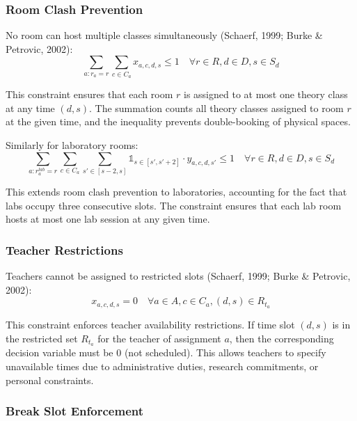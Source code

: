 \documentclass[12pt,a4paper]{article}
\begin{document}
\subsubsection{Room Clash Prevention}

No room can host multiple classes simultaneously (Schaerf, 1999; Burke \& Petrovic, 2002):
\begin{equation}
\sum_{a: r_a = r} \sum_{c \in C_a} x_{a,c,d,s} \leq 1 \quad \forall r \in R, d \in D, s \in S_d
\end{equation}

This constraint ensures that each room $r$ is assigned to at most one theory class at any time $(d,s)$. The summation counts all theory classes assigned to room $r$ at the given time, and the inequality prevents double-booking of physical spaces.

Similarly for laboratory rooms:
\begin{equation}
\sum_{a: r_a^{lab} = r} \sum_{c \in C_a} \sum_{s' \in [s-2, s]} \mathbb{1}_{s \in [s', s'+2]} \cdot y_{a,c,d,s'} \leq 1 \quad \forall r \in R, d \in D, s \in S_d
\end{equation}

This extends room clash prevention to laboratories, accounting for the fact that labs occupy three consecutive slots. The constraint ensures that each lab room hosts at most one lab session at any given time.

\subsubsection{Teacher Restrictions}

Teachers cannot be assigned to restricted slots (Schaerf, 1999; Burke \& Petrovic, 2002):
\begin{equation}
x_{a,c,d,s} = 0 \quad \forall a \in A, c \in C_a, (d,s) \in R_{t_a}
\end{equation}

This constraint enforces teacher availability restrictions. If time slot $(d,s)$ is in the restricted set $R_{t_a}$ for the teacher of assignment $a$, then the corresponding decision variable must be 0 (not scheduled). This allows teachers to specify unavailable times due to administrative duties, research commitments, or personal constraints.

\subsubsection{Break Slot Enforcement}
\end{document}
